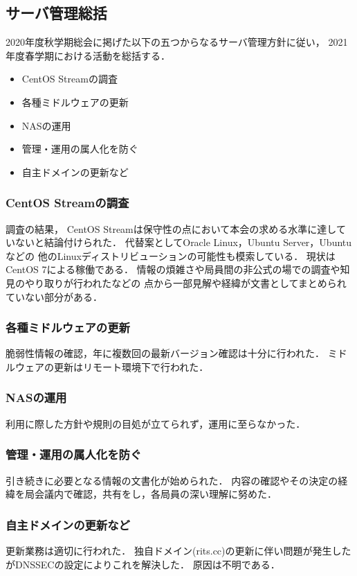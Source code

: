 \subsection*{サーバ管理総括}


2020年度秋学期総会に掲げた以下の五つからなるサーバ管理方針に従い，
2021年度春学期における活動を総括する．
\begin{itemize}
    \item CentOS Streamの調査
    \item 各種ミドルウェアの更新
    \item NASの運用
    \item 管理・運用の属人化を防ぐ
    \item 自主ドメインの更新など
\end{itemize}

\subsubsection*{CentOS Streamの調査}
調査の結果，
CentOS Streamは保守性の点において本会の求める水準に達していないと結論付けられた．
代替案としてOracle Linux，Ubuntu Server，Ubuntuなどの
他のLinuxディストリビューションの可能性も模索している．
現状はCentOS 7による稼働である．
情報の煩雑さや局員間の非公式の場での調査や知見のやり取りが行われたなどの
点から一部見解や経緯が文書としてまとめられていない部分がある．

\subsubsection*{各種ミドルウェアの更新}
脆弱性情報の確認，年に複数回の最新バージョン確認は十分に行われた．
ミドルウェアの更新はリモート環境下で行われた．

\subsubsection*{NASの運用}
利用に際した方針や規則の目処が立てられず，運用に至らなかった．

\subsubsection*{管理・運用の属人化を防ぐ}
引き続きに必要となる情報の文書化が始められた．
内容の確認やその決定の経緯を局会議内で確認，共有をし，各局員の深い理解に努めた．

\subsubsection*{自主ドメインの更新など}
更新業務は適切に行われた．
独自ドメイン(rits.cc)の更新に伴い問題が発生したがDNSSECの設定によりこれを解決した．
原因は不明である．
